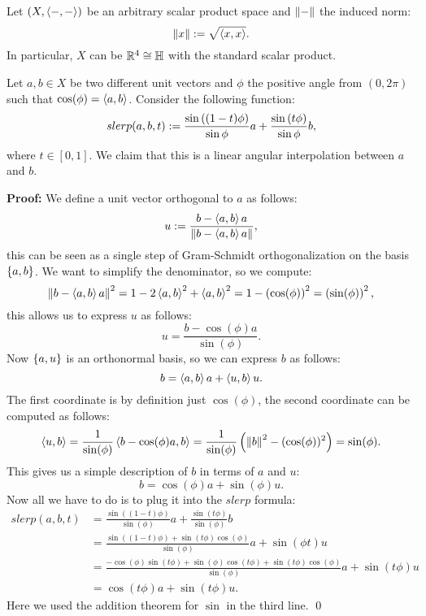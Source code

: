 \documentclass{scrartcl}
\newcommand{\exercise}[2]{\vspace{1em}\noindent{\bf Exercise #1 (#2)}}
\begin{document}
\hfill 
{\footnotesize }
\newline
{\footnotesize }

\noindent\hrulefill

\exercise{7.1}{SLERP}
Let $(X, \left\langle-,-\right\rangle)$ be an arbitrary scalar product space
and $\left\lVert -\right\rVert$ the induced norm:
\[
  \left\lVert x\right\rVert := \sqrt{\left\langle x,x\right\rangle}.
\]
In particular, $X$ can be $\mathbb{R}^4 \cong \mathbb{H}$ with the
standard scalar product.

Let $a,b\in X$ be two different unit vectors and $\phi$ the 
positive angle from $(0, 2\pi)$ such that 
$\cos(\phi) = \left\langle a,b\right\rangle$.
Consider the following function:
\[
    slerp(a, b, t) := 
    \frac{\sin\left((1-t)\phi\right)}{\sin{\phi}} a +
    \frac{\sin\left(t\phi\right)}{\sin{\phi}} b,
\]
where $t\in [0, 1]$.
We claim that this is a linear angular interpolation
between $a$ and $b$.

\noindent \textbf{Proof: } We define a unit vector orthogonal
to $a$ as follows:
\[
  u := \frac{b - \left\langle a,b\right\rangle a}{\left\lVert b - \left\langle a,b\right\rangle a\right\rVert},
\]
this can be seen as a single step of Gram-Schmidt
orthogonalization on the basis ${\left\{a, b\right\}}$.
We want to simplify the denominator, so we compute:
\[
  \left\lVert b - \left\langle a,b\right\rangle a\right\rVert^2 
  = 1 - 2\left\langle a,b\right\rangle^2 + \left\langle a,b\right\rangle^2
  = 1 - \left(\cos(\phi)\right)^2 
  = \left(\sin(\phi)\right)^2,
\]
this allows us to express $u$ as follows:
\[
  u = \frac{b - \cos(\phi)a}{\sin(\phi)}.
\]
Now ${\left\{a, u\right\}}$ is an orthonormal basis, so we can 
express $b$ as follows:
\[
  b = \left\langle a,b\right\rangle a + \left\langle u,b\right\rangle u.
\]
The first coordinate is by definition just $\cos(\phi)$,
the second coordinate can be computed as follows:
\[
  \left\langle u,b\right\rangle 
  = \frac{1}{\sin(\phi)}\left\langle b - \cos(\phi)a,b\right\rangle
  = \frac{1}{\sin(\phi)}\left(\left\lVert b\right\rVert^2 - (\cos(\phi))^2\right) 
  = \sin(\phi).
\]
This gives us a simple description of $b$ in terms of
$a$ and $u$:
\[
  b = \cos(\phi)a + \sin(\phi)u.
\]
Now all we have to do is to plug it into the $slerp$ formula:
\begin{align*}
  slerp(a, b, t) 
    &= \frac{\sin((1-t)\phi)}{\sin(\phi)} a + 
       \frac{\sin(t\phi)}{\sin(\phi)} b \\
    &= \frac{\sin((1-t)\phi) + \sin(t\phi)\cos(\phi)}{\sin(\phi)}
       a + \sin(\phi t) u \\
    &= \frac{-\cos(\phi)\sin(t\phi) + \sin(\phi)\cos(t\phi)
              + \sin(t\phi)\cos(\phi)
        }{\sin(\phi)} a  + \sin(t\phi) u \\
    &= \cos(t\phi)a + \sin(t\phi)u.
\end{align*}
Here we used the addition theorem for $\sin$ in the third line.
\hfill \qed
\end{document}
